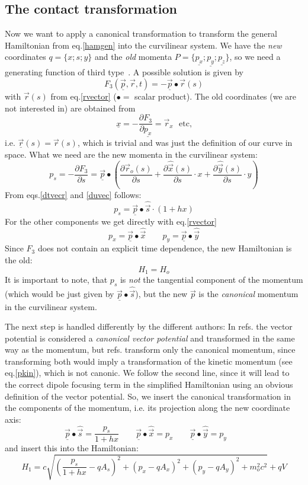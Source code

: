 \documentclass[12pt]{article}
\newcommand\beq{\begin{equation}}
\newcommand\eeq{\end{equation}}
\newcommand{\uvec}[1]{\mbox{$\hat{\vec{#1}}$}}
\newcommand{\cvec}[1]{\mbox{$\underline{\vec{#1}}$}}
\newcommand{\csca}[1]{\mbox{$\underline{#1}$}}
\begin{document}
\subsection{The contact transformation}
Now we want to apply a canonical transformation to transform the general Hamiltonian
from eq.\ref{hamgen} into the curvilinear system.
We have the {\em new} coordinates $q=\{x;s;y\}$ and the {\em old} momenta $P=\{\csca{p_x}; \csca{p_y}; \csca{p_z}\}$, so we need a generating function of third type~\cite{rees}.
A possible solution is given by
\beq
F_3 (\cvec{p},\vec{r},t) = - \cvec{p}\bullet \vec{r}(s)
\eeq
with $\vec{r}(s)$ from eq.\ref{rvector} ($\bullet=$ scalar product).
The old coordinates (we are not interested in) are obtained from
\[
\csca{x}=-\frac{\partial F_3}{\partial \csca{p_x}}= \vec{r}_x\mbox{~~etc,}
\]
i.e. $\cvec{r}(s)=\vec{r}(s)$, which is trivial and was just the definition of
our curve in space.
What we need are the new momenta in the curvilinear system:
\beq
p_s = -\frac{\partial F_3}{\partial s} = \cvec{p}\bullet\left(
\frac{\partial \vec{r}_o(s)}{\partial s} +
\frac{\partial \uvec{x}(s)}{\partial s}\cdot x +
\frac{\partial \uvec{y}(s)}{\partial s}\cdot y \right)
\eeq
From eqs.\ref{dtvecr} and \ref{duvec} follows:
\beq
p_s = \cvec{p}\bullet \uvec{s} \cdot (1+hx)
\eeq
For the other components we get directly with eq.\ref{rvector}
\beq
p_x = \cvec{p}\bullet \uvec{x} \qquad p_y = \cvec{p}\bullet \uvec{y}
\eeq
Since $F_3$ does not contain an explicit time dependence, the new Hamiltonian is the old:
\beq
H_1=H_o
\eeq
It is important to note, that $p_s$ is {\em not} the tangential component of the momentum
(which would be just given by $\cvec{p}\bullet \uvec{s}$), but the new $\vec{p}$
is the {\em canonical} momentum in the  curvilinear system.

The next step is handled differently by the different authors: In refs.\cite{ruth,cs,es} the vector potential is considered a {\em canonical vector potential} and transformed in the same way
as the momentum, but refs.\cite{jbsls,rees} transform only the canonical momentum, since transforming both
would imply a transformation of the kinetic momentum (see eq.\ref{pkin}), which is not canonic.
We follow the second line, since it will lead to the correct dipole focusing term in the simplified Hamiltonian using an obvious definition of the vector potential.
So, we insert the canonical transformation in the components of the momentum, i.e. its projection along the new coordinate axis:
\[
\cvec{p}\bullet \uvec{s} = \frac{p_s}{1+hx}\qquad
\cvec{p}\bullet \uvec{x} = p_x \qquad \cvec{p}\bullet \uvec{y} = p_y \qquad
\]
and insert this into the Hamiltonian:
\beq\label{ham1}
H_1=c\sqrt{\left(\frac{p_s}{1+hx}-qA_s\right)^2+ (p_x-qA_x)^2 + (p_y-qA_y)^2 +m_o^2c^2}+qV
\eeq
\end{document}
